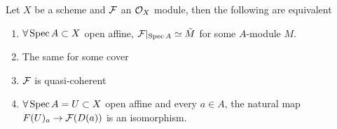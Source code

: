 \documentclass[../main.tex]{subfiles}
\begin{document}
\begin{thm}
	Let $X$ be a scheme and $\mathcal{F}$ an $\mathcal{O}_X$ module, then the following are equivalent
	\begin{enumerate}
	\item $\forall \operatorname{Spec} A \subset X$ open affine, $\mathcal{F}|_{\operatorname{Spec} A} \simeq \tilde M$ for some $A$-module $M$.
	\item The same for some cover
	\item $\mathcal{F}$ is quasi-coherent
	\item $\forall \operatorname{Spec} A = U \subset X$ open affine and every $a\in A$, the natural map $F( U) _a \to \mathcal{F}( D( a) ) $ is an isomorphism.
	\end{enumerate}
	
\end{thm}
\end{document}
